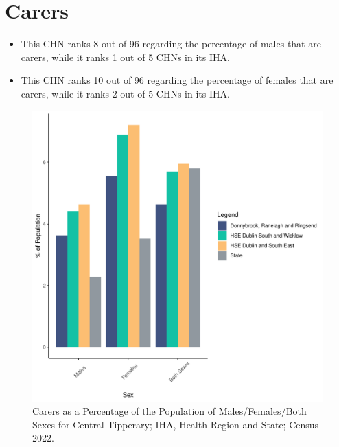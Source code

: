 \documentclass{article}
\begin{document}
\section{Carers}\label{sect:Carers}
\begin{itemize}
\item This CHN ranks  8 out of 96 regarding the percentage of males that are carers, while it ranks   1 out of 5 CHNs in its IHA.
\item This CHN ranks  10 out of 96 regarding the percentage of females that are carers, while it ranks   2 out of 5 CHNs in its IHA.
\end{itemize}
\begin{figure}[H]
	\centering
	\includegraphics[width = 150mm]{../figures/CareED.pdf}
	\caption{Carers as a Percentage of the Population of Males/Females/Both Sexes for Central Tipperary; IHA, Health Region and State; Census 2022.}
	\label{fig:2ae19629-1a6a-13a3-e055-000000000001}
	\end{figure}
\end{document}
